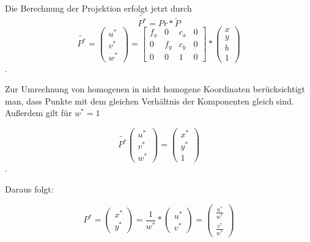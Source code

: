 Die Berechnung der Projektion erfolgt jetzt durch \begin{equation}
  \tilde{P^*}=Pr*\tilde{P} \end{equation} \begin{equation} \tilde{P^*}=
  \begin{pmatrix} u^*\\v^*\\w^* \end{pmatrix} = \begin{bmatrix} f_x&0&c_x&0\\
    0&f_y&c_y&0\\ 0&0&1&0 \end{bmatrix} * \begin{pmatrix} x\\y\\b\\1
  \end{pmatrix} \end{equation}.\cite{Bradski2008}



Zur Umrechnung von homogenen in nicht homogene Koordinaten berücksichtigt man,
dass Punkte mit dem gleichen Verhältnis der Komponenten gleich sind. Außerdem
gilt für $w^*=1$

\begin{equation}
  \tilde{P^*}
  \begin{pmatrix}
    u^*\\v^*\\w^* \end{pmatrix} = \begin{pmatrix} x^*\\y^*\\1 \end{pmatrix}
\end{equation}.

Daraus folgt:

\begin{equation} P^*= \begin{pmatrix} x^*\\ y^* \end{pmatrix} = \frac{1}{w^*}*
  \begin{pmatrix} u^*\\ v^* \end{pmatrix} = \begin{pmatrix} \frac{u^*}{w^*}\\
    \frac{v^*}{w^*} \end{pmatrix} \end{equation}

